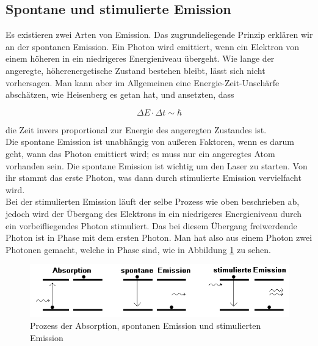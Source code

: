 
\subsection{Spontane und stimulierte Emission}

Es existieren zwei Arten von Emission. Das zugrundeliegende Prinzip erklären wir an der spontanen Emission. Ein Photon wird emittiert, wenn ein Elektron 
von einem höheren in ein niedrigeres Energieniveau übergeht. Wie lange der angeregte, höherenergetische Zustand bestehen bleibt, lässt sich nicht vorhersagen. Man kann aber im Allgemeinen 
eine Energie-Zeit-Unschärfe abschätzen, wie Heisenberg es getan hat, und ansetzten, dass 

\begin{equation*}
    \Delta E \cdot \Delta t \sim  \hbar
\end{equation*}

die Zeit invers proportional zur Energie des angeregten Zustandes ist.\\
Die spontane Emission ist unabhängig von außeren Faktoren, wenn es darum geht, wann das Photon emittiert wird; es muss
nur ein angeregtes Atom vorhanden sein. Die spontane Emission ist wichtig um den Laser zu starten. Von ihr stammt das erste Photon, was dann 
durch stimulierte Emission vervielfacht wird.\\
Bei der stimulierten Emission läuft der selbe Prozess wie oben beschrieben ab, jedoch wird der Übergang des Elektrons in ein niedrigeres Energieniveau
durch ein vorbeifliegendes Photon stimuliert. Das bei diesem Übergang freiwerdende Photon ist in Phase mit dem ersten Photon. Man hat also aus einem Photon
zwei Photonen gemacht, welche in Phase sind, wie in Abbildung \ref{bild:Emission} zu sehen.

\begin{figure} [ht] 
    \centering
    \includegraphics[width = 13cm]{Bilder/Auswertung/Emission.jpg}
    \caption{Prozess der Absorption, spontanen Emission und stimulierten Emission\protect \footnotemark}
    \label{bild:Emission}
\end{figure}

